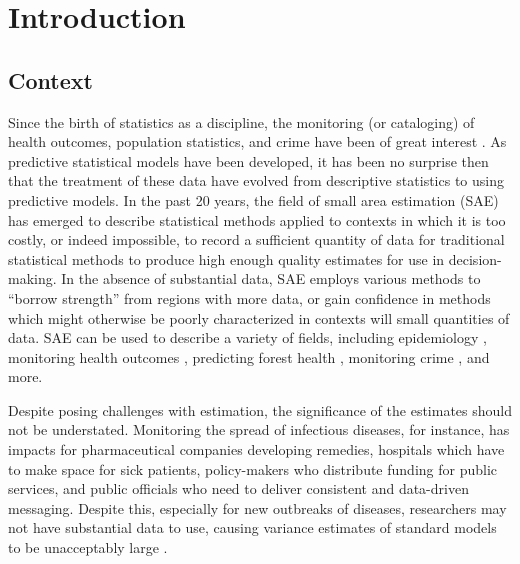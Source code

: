 \documentclass[twoside,12pt,bibstyle=chem-acs]{reedthesis}
\begin{document}
 \chapter{Introduction}
\label{chap: intro}

\section{Context}
Since the birth of statistics as a discipline, the monitoring (or cataloging) of health outcomes, population statistics, and crime have been of great interest \cite{hacking_taming_1990}. As predictive statistical models have been developed, it has been no surprise then that the treatment of these data have evolved from descriptive statistics to using predictive models. In the past 20 years, the field of small area estimation (SAE) has emerged to describe statistical methods applied to contexts in which it is too costly, or indeed impossible, to record a sufficient quantity of data for traditional statistical methods to produce high enough quality estimates for use in decision-making. In the absence of substantial data, SAE employs various methods to ``borrow strength'' from regions with more data, or gain confidence in methods which might otherwise be poorly characterized in contexts will small quantities of data. SAE can be used to describe a variety of fields, including epidemiology \cite{wehrhahn_bayesian_2020}, monitoring health outcomes \cite{cheam_modelbased_2017}, predicting forest health \cite{dettmann_review_2022}, monitoring crime \cite{povala_burglary_2020}, and more. 

Despite posing challenges with estimation, the significance of the estimates should not be understated. Monitoring the spread of infectious diseases, for instance, has impacts for pharmaceutical companies developing remedies, hospitals which have to make space for sick patients, policy-makers who distribute funding for public services, and public officials who need to deliver consistent and data-driven messaging. Despite this, especially for new outbreaks of diseases, researchers may not have substantial data to use, causing variance estimates of standard models to be unacceptably large \cite{dorfman_towards_2018}.
\end{document}
